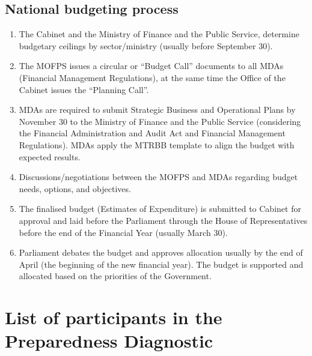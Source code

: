 \documentclass[
  10pt,
]{book}
\begin{document}
\hypertarget{national-budgeting-process-1}{%
\section{National budgeting process}\label{national-budgeting-process-1}}

\begin{enumerate}
\def\labelenumi{\arabic{enumi}.}
\item
  The Cabinet and the Ministry of Finance and the Public Service, determine budgetary ceilings by sector/ministry (usually before September 30).
\item
  The MOFPS issues a circular or ``Budget Call'' documents to all MDAs (Financial Management Regulations), at the same time the Office of the Cabinet issues the ``Planning Call''.
\item
  MDAs are required to submit Strategic Business and Operational Plans by November 30 to the Ministry of Finance and the Public Service (considering the Financial Administration and Audit Act and Financial Management Regulations). MDAs apply the MTRBB template to align the budget with expected results.
\item
  Discussions/negotiations between the MOFPS and MDAs regarding budget needs, options, and objectives.
\item
  The finalised budget (Estimates of Expenditure) is submitted to Cabinet for approval and laid before the Parliament through the House of Representatives before the end of the Financial Year (usually March 30).
\item
  Parliament debates the budget and approves allocation usually by the end of April (the beginning of the new financial year). The budget is supported and allocated based on the priorities of the Government.
\end{enumerate}

\hypertarget{appendixD}{%
\chapter{List of participants in the Preparedness Diagnostic}\label{appendixD}}
\end{document}
